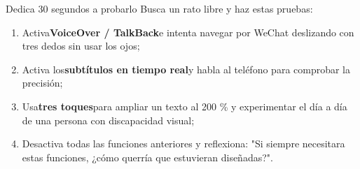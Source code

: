 \begin{tcbpractice}{Dedica 30 segundos a probarlo}
Busca un rato libre y haz estas pruebas:

\begin{enumerate}
  \item Activa\textbf{VoiceOver / TalkBack}e intenta navegar por WeChat deslizando con tres dedos sin usar los ojos;
  \item Activa los\textbf{subtítulos en tiempo real}y habla al teléfono para comprobar la precisión;
  \item Usa\textbf{tres toques}para ampliar un texto al 200 \% y experimentar el día a día de una persona con discapacidad visual;
  \item Desactiva todas las funciones anteriores y reflexiona: "Si siempre necesitara estas funciones, ¿cómo querría que estuvieran diseñadas?".
\end{enumerate}

\end{tcbpractice}
